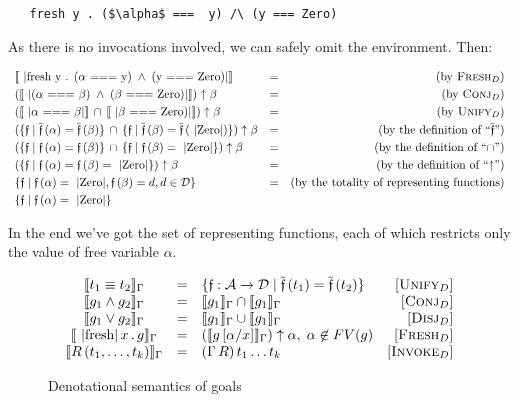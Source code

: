 \begin{lstlisting}
   fresh y . ($\alpha$ ===  y) /\ (y === Zero)
\end{lstlisting}

As there is no invocations involved, we can safely omit the environment. Then:

\[
\begin{array}{lcr}
  \sembr{\mbox{\lstinline|fresh y . ($\alpha$ === y) $\,\wedge\,$ (y === Zero)|}}&=&\mbox{(by \textsc{Fresh$_D$})}\\[1mm]
  (\sembr{\mbox{\lstinline|($\alpha$ === $\beta$) $\,\wedge\,$ ($\beta$ === Zero)|}})\uparrow\beta&=&\mbox{(by \textsc{Conj$_D$})}\\[1mm]
  (\sembr{\mbox{\lstinline|$\alpha$ === $\beta$|}} \,\cap\, \sembr{\mbox{\lstinline|$\beta$ === Zero)|}})\uparrow\beta&=&\mbox{(by \textsc{Unify$_D$})}\\[1mm]
  (\{\mathfrak{f}\mid \overline{\mathfrak{f}}\,(\alpha)=\overline{\mathfrak{f}}\,(\beta)\} \,\cap\, \{\mathfrak{f}\mid \overline{\mathfrak{f}}\,(\beta)=\overline{\mathfrak{f}}\,(\mbox{\lstinline|Zero|})\})\uparrow\beta&=&\mbox{(by the definition of ``$\overline{\mathfrak{f}}$'')}\\[1mm]
  (\{\mathfrak{f}\mid \mathfrak{f}\,(\alpha)=\mathfrak{f}\,(\beta)\} \,\cap\, \{\mathfrak{f}\mid \mathfrak{f}\,(\beta)=\mbox{\lstinline|Zero|}\})\uparrow\beta&=&\mbox{(by the definition of ``$\cap$'')}\\[1mm]
  (\{\mathfrak{f}\mid \mathfrak{f}\,(\alpha)=\mathfrak{f}\,(\beta)=\mbox{\lstinline|Zero|}\})\uparrow\beta&=&\mbox{(by the definition of ``$\uparrow$'')}\\[1mm]
  \{\mathfrak{f}\mid \mathfrak{f}\,(\alpha)=\mbox{\lstinline|Zero|}, \mathfrak{f}\,(\beta)=d, d\in\mathcal{D}\}&=&\mbox{(by the totality of representing functions)}\\[1mm]
  \{\mathfrak{f}\mid \mathfrak{f}\,(\alpha)=\mbox{\lstinline|Zero|}\}&&
\end{array}
\]

In the end we've got the set of representing functions, each of which restricts only the value of free variable $\alpha$. 

\begin{figure}[t]
  \[
  \begin{array}{cclr}
    \sembr{t_1\equiv t_2}_\Gamma&=&\{\mathfrak f : \mathcal{A}\to\mathcal{D}\mid \overline{\mathfrak{f}}\,(t_1)=\overline{\mathfrak{f}}\,(t_2)\}& \ruleno{Unify$_D$}\\
    \sembr{g_1\wedge g_2}_\Gamma&=&\sembr{g_1}_\Gamma\cap\sembr{g_1}_\Gamma&\ruleno{Conj$_D$}\\
    \sembr{g_1\vee g_2}_\Gamma&=&\sembr{g_1}_\Gamma\cup\sembr{g_1}_\Gamma&\ruleno{Disj$_D$}\\
    \sembr{\mbox{\lstinline|fresh|}\,x\,.\,g}_\Gamma&=&(\sembr{g\,[\alpha/x]}_\Gamma)\uparrow\alpha,\;\alpha\not\in FV(g)& \ruleno{Fresh$_D$}\\
    \sembr{R\,(t_1,\dots,t_k)}_\Gamma&=&(\Gamma\,R)\,t_1\dots t_k & \ruleno{Invoke$_D$}
  \end{array}
  \]
  \caption{Denotational semantics of goals}
  \label{denotational_semantics_of_goals}
\end{figure}

